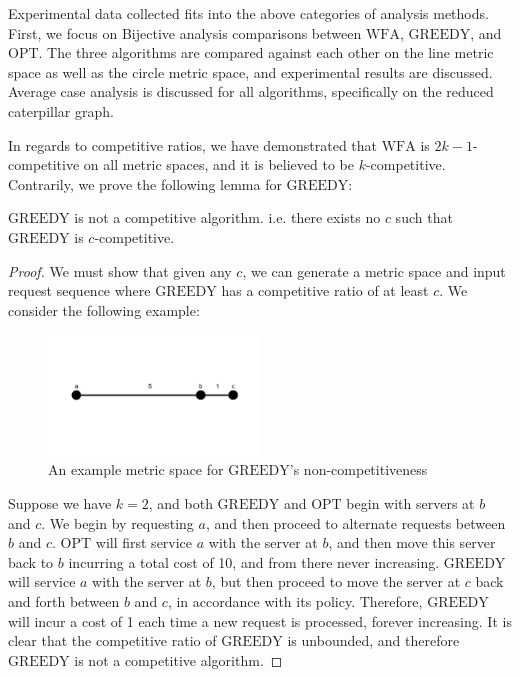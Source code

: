 Experimental data collected fits into the above categories of analysis methods. First, we focus on Bijective analysis comparisons between $\mathrm{WFA}$, $\mathrm{GREEDY}$, and $\mathrm{OPT}$. The three algorithms are compared against each other on the line metric space as well as the circle metric space, and experimental results are discussed. Average case analysis is discussed for all algorithms, specifically on the reduced caterpillar graph. 

In regards to competitive ratios, we have demonstrated that $\mathrm{WFA}$ is $2k-1$-competitive on all metric spaces, and it is believed to be $k$-competitive. Contrarily, we prove the following lemma for $\mathrm{GREEDY}$:

\begin{lemma}
    $\mathrm{GREEDY}$ is not a competitive algorithm. i.e. there exists no $c$ such that $\mathrm{GREEDY}$ is $c$-competitive.
\end{lemma}

\begin{proof}
    We must show that given any $c$, we can generate a metric space and input request sequence where $\mathrm{GREEDY}$ has a competitive ratio of at least $c$. We consider the following example:
    \begin{figure}[H]
        \centering
        \includegraphics[width=0.5\textwidth]{images/line.png}
        \caption{An example metric space for $\mathrm{GREEDY}$'s non-competitiveness}
    \end{figure}
    Suppose we have $k = 2$, and both $\mathrm{GREEDY}$ and $\mathrm{OPT}$ begin with servers at $b$ and $c$. We begin by requesting $a$, and then proceed to alternate requests between $b$ and $c$. $\mathrm{OPT}$ will first service $a$ with the server at $b$, and then move this server back to $b$ incurring a total cost of 10, and from there never increasing. $\mathrm{GREEDY}$ will service $a$ with the server at $b$, but then proceed to move the server at $c$ back and forth between $b$ and $c$, in accordance with its policy. Therefore, $\mathrm{GREEDY}$ will incur a cost of 1 each time a new request is processed, forever increasing. It is clear that the competitive ratio of $\mathrm{GREEDY}$ is unbounded, and therefore $\mathrm{GREEDY}$ is not a competitive algorithm.
\end{proof}

